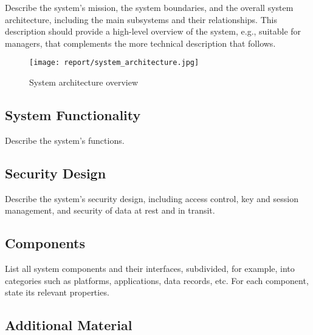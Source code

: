 \documentclass[english]{article}
\begin{document}
Describe the system's mission,  the system boundaries,
and the overall system architecture, including the main subsystems and
their relationships.   This description should provide a high-level
overview of the system, e.g., suitable for managers, that complements
the more technical description that follows.

\begin{figure}
  \texttt{[image: report/system\_architecture.jpg]}
  \caption{System architecture overview}
  \label{fig:system_architecture}
\end{figure}


\subsection{System Functionality}

Describe the system's functions.


\subsection{Security Design}

Describe the system's security design, including access control, key and session management,  and security of data at rest and in transit.


\subsection{Components}

List all system components and their interfaces, subdivided, for example, into
  categories such as platforms, applications, data records, etc. For
  each component, state its relevant properties.



\subsection{Additional Material}
\end{document}
